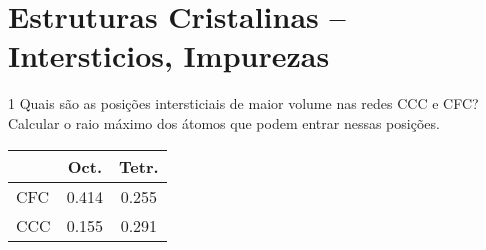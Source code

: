 \documentclass[\mainfilename]{subfiles}
\begin{document}
\part*{Estruturas Cristalinas -- Intersticios, Impurezas}

\setcounter{question}{11}

\begin{questionBox}1{ %
    Quais são as posições intersticiais de maior volume nas redes CCC e CFC? Calcular o raio máximo dos átomos que podem entrar nessas posições.
} %
    \answer{}
    \begin{center}
        \vspace{1ex}
        \begin{tabular}{l c c}
            \toprule
            
                & Oct. & Tetr.
            
            \\\midrule
            
                CFC & 0.414 & 0.255
                \\
                CCC & 0.155 & 0.291
            
            \\\bottomrule
        \end{tabular}
        \vspace{2ex}
    \end{center}
\end{questionBox}

\setcounter{question}{13}
\end{document}
